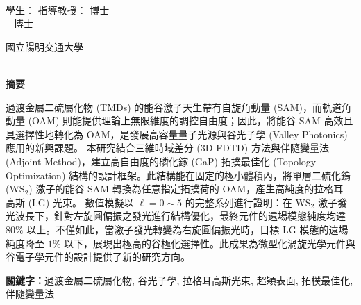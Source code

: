 \begin{center}
    \large
    \begin{singlespace}    
        \textbf{\chineseTitle{}} \\[0.5cm]
    \end{singlespace}

    \begin{singlespace}    
    學生：\studentCnName  \hspace{2.5cm}  指導教授：\advisorCnName \hspace{0.1cm} 博士 \\

    \ifdefined\advisorCnNameB %
        \hspace{9.6cm}  \advisorCnNameB ~ 博士 \\
    \fi
    \end{singlespace}

    \vspace{0.5cm}

    \begin{singlespace}
        國立陽明交通大學\\
        \NameofDepartmentInstituteCN\\[0.2cm]
    \end{singlespace}

    \textbf{摘\hspace{1cm}要} \\[0.5cm]

\end{center}

\normalsize 
過渡金屬二硫屬化物 (TMDs) 的能谷激子天生帶有自旋角動量 (SAM)，而軌道角動量 (OAM) 則能提供理論上無限維度的調控自由度；因此，將能谷 SAM 高效且具選擇性地轉化為 OAM，是發展高容量量子光源與谷光子學 (Valley Photonics) 應用的新興課題。
本研究結合三維時域差分 (3D FDTD) 方法與伴隨變量法 (Adjoint Method)，建立高自由度的磷化鎵 (GaP) 拓撲最佳化 (Topology Optimization) 結構的設計框架。此結構能在固定的極小體積內，將單層二硫化鎢 (WS$_2$) 激子的能谷 SAM 轉換為任意指定拓撲荷的 OAM，產生高純度的拉格耳-高斯 (LG) 光束。
數值模擬以 $\ell = 0\sim5$ 的完整系列進行證明：在 WS$_2$ 激子發光波長下，針對左旋圓偏振之發光進行結構優化，最終元件的遠場模態純度均達 $80\%$ 以上。不僅如此，當激子發光轉變為右旋圓偏振光時，目標 LG 模態的遠場純度降至 $1\%$ 以下，展現出極高的谷極化選擇性。此成果為微型化渦旋光學元件與谷電子學元件的設計提供了新的研究方向。
\vspace{1cm}

\textbf{關鍵字：}過渡金屬二硫屬化物, 谷光子學, 拉格耳高斯光束, 超穎表面, 拓樸最佳化, 伴隨變量法